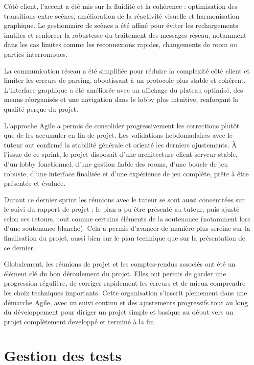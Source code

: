\documentclass[a4paper, 11pt]{article}
\begin{document}
Côté client, l’accent a été mis sur la fluidité et la cohérence : optimisation des transitions entre scènes, amélioration de la réactivité visuelle et harmonisation graphique. Le gestionnaire de scènes a été affiné pour éviter les rechargements inutiles et renforcer la robustesse du traitement des messages réseau, notamment dans les cas limites comme les reconnexions rapides, changements de room ou parties interrompues.

La communication réseau a été simplifiée pour réduire la complexité côté client et limiter les erreurs de parsing, aboutissant à un protocole plus stable et cohérent. L’interface graphique a été améliorée avec un affichage du plateau optimisé, des menus réorganisés et une navigation dans le lobby plus intuitive, renforçant la qualité perçue du projet.

L’approche Agile a permis de consolider progressivement les corrections plutôt que de les accumuler en fin de projet. Les validations hebdomadaires avec le tuteur ont confirmé la stabilité générale et orienté les derniers ajustements. À l’issue de ce sprint, le projet disposait d’une architecture client-serveur stable, d’un lobby fonctionnel, d’une gestion fiable des rooms, d’une boucle de jeu robuste, d’une interface finalisée et d’une expérience de jeu complète, prête à être présentée et évaluée.

Durant ce dernier sprint les réunions avec le tuteur se sont aussi concentrées sur le suivi du rapport de projet : le plan a pu être présenté au tuteur, puis ajusté selon ses retours, tout comme certains éléments de la soutenance (notamment lors d’une soutenance blanche). Cela a permis d’avancer de manière plus sereine sur la finalisation du projet, aussi bien sur le plan technique que sur la présentation de ce dernier.

Globalement, les réunions de projet et les comptes-rendus associés ont été un élément clé du bon déroulement du projet. Elles ont permis de garder une progression régulière, de corriger rapidement les erreurs et de mieux comprendre les choix techniques importants. Cette organisation s’inscrit pleinement dans une démarche Agile, avec un suivi continu et des ajustements progressifs tout au long du développement pour diriger un projet simple et basique au début vers un projet complètement developpé et terminé à la fin.

\section{Gestion des tests}
\end{document}
